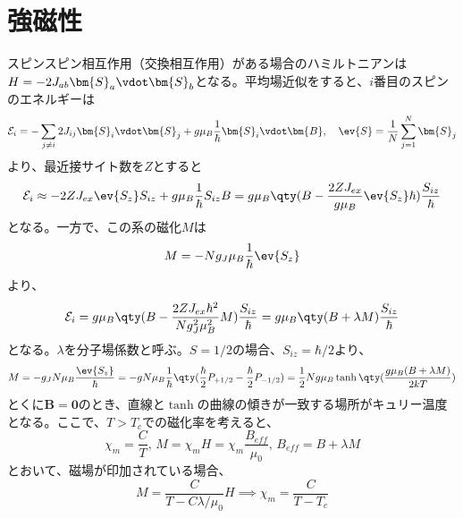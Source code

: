 \section{強磁性}
スピンスピン相互作用（交換相互作用）がある場合のハミルトニアンは$H = -2J_{ab}\bm{S}_a\vdot\bm{S}_b$となる。平均場近似をすると、$i$番目のスピンのエネルギーは
\begin{equation}
	\mathcal{E}_i = -\sum_{j\neq i}2J_{ij}\bm{S}_i\vdot\bm{S}_j + g\mu_B\frac{1}{\hbar}\bm{S}_i\vdot\bm{B},\quad\ev{S} = \frac{1}{N}\sum_{j=1}^N\bm{S}_j
\end{equation}
より、最近接サイト数を$Z$とすると
\begin{equation}
	\mathcal{E}_i \approx -2ZJ_{ex}\ev{S_z}S_{iz} + g\mu_B\frac{1}{\hbar}S_{iz}B = g\mu_B\qty(B-\frac{2ZJ_{ex}}{g\mu_B}\ev{S_z}\hbar)\frac{S_{iz}}\hbar{}
\end{equation}
となる。一方で、この系の磁化$M$は
\begin{equation}
	M = -Ng_J\mu_B\frac{1}{\hbar}\ev{S_z}
\end{equation}
より、
\begin{equation}
	\mathcal{E}_i = g\mu_B\qty(B-\frac{2ZJ_{ex}\hbar^2}{Ng_J^2\mu_B^2}M)\frac{S_{iz}}{\hbar} = g\mu_B\qty(B+\lambda{}M)\frac{S_{iz}}{\hbar}
\end{equation}
となる。$\lambda$を分子場係数と呼ぶ。$S=1/2$の場合、$S_{iz}=\hbar/2$より、
\begin{equation}
	M = -g_JN\mu_B\frac{\ev{S_z}}{\hbar} = -gN\mu_B\frac{1}{\hbar}\qty(\frac{\hbar}{2}P_{+1/2} - \frac{\hbar}{2}P_{-1/2}) = \frac{1}{2}Ng\mu_B\tanh\qty(\frac{g\mu_B(B+\lambda{}M)}{2kT})
\end{equation}
とくに$\bm{B}=\bm{0}$のとき、直線と$\tanh$の曲線の傾きが一致する場所がキュリー温度となる。ここで、$T>T_c$での磁化率を考えると、
\begin{equation}
	\chi_m = \frac{C}{T},\,M = \chi_mH = \chi_m\frac{B_{eff}}{\mu_0} ,\,B_{eff} = B + \lambda{}M
\end{equation}
とおいて、磁場が印加されている場合、
\begin{equation}
	M = \frac{C}{T-C\lambda/\mu_0}H \implies \chi_m =  \frac{C}{T-T_c}
\end{equation}
